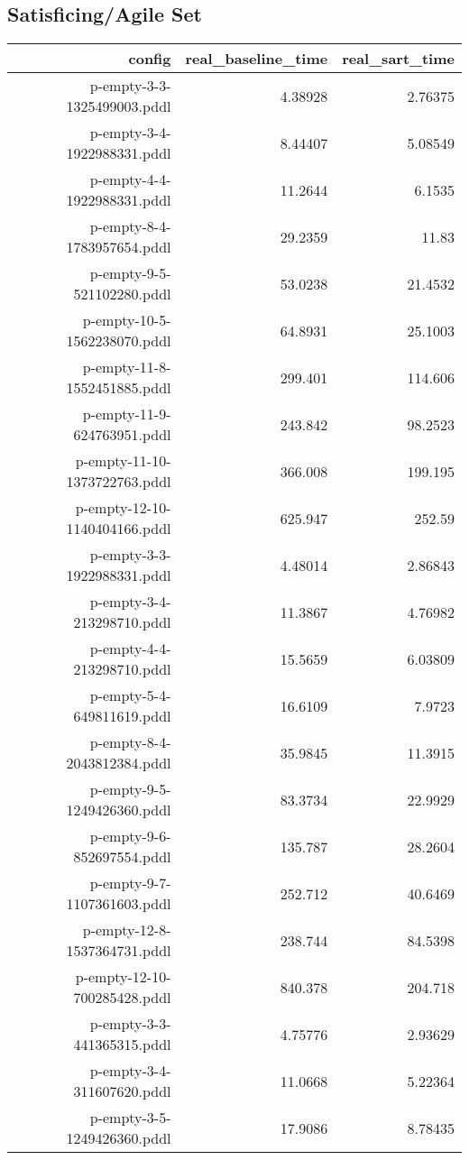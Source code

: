 \documentclass{article}
\begin{document}
                    \subsection*{Satisficing/Agile Set}
                    
                            \begin{center}
                            \scriptsize
                            \begin{tabular}{r|r|r}
                            config & real\_baseline\_time & real\_sart\_time\\\midrule
                             p-empty-3-3-1325499003.pddl&4.38928&2.76375\\
 p-empty-3-4-1922988331.pddl&8.44407&5.08549\\
 p-empty-4-4-1922988331.pddl&11.2644&6.1535\\
 p-empty-8-4-1783957654.pddl&29.2359&11.83\\
 p-empty-9-5-521102280.pddl&53.0238&21.4532\\
 p-empty-10-5-1562238070.pddl&64.8931&25.1003\\
 p-empty-11-8-1552451885.pddl&299.401&114.606\\
 p-empty-11-9-624763951.pddl&243.842&98.2523\\
 p-empty-11-10-1373722763.pddl&366.008&199.195\\
 p-empty-12-10-1140404166.pddl&625.947&252.59\\
 p-empty-3-3-1922988331.pddl&4.48014&2.86843\\
 p-empty-3-4-213298710.pddl&11.3867&4.76982\\
 p-empty-4-4-213298710.pddl&15.5659&6.03809\\
 p-empty-5-4-649811619.pddl&16.6109&7.9723\\
 p-empty-8-4-2043812384.pddl&35.9845&11.3915\\
 p-empty-9-5-1249426360.pddl&83.3734&22.9929\\
 p-empty-9-6-852697554.pddl&135.787&28.2604\\
 p-empty-9-7-1107361603.pddl&252.712&40.6469\\
 p-empty-12-8-1537364731.pddl&238.744&84.5398\\
 p-empty-12-10-700285428.pddl&840.378&204.718\\
 p-empty-3-3-441365315.pddl&4.75776&2.93629\\
 p-empty-3-4-311607620.pddl&11.0668&5.22364\\
 p-empty-3-5-1249426360.pddl&17.9086&8.78435\\

\end{tabular}
\end{center}
\end{document}
